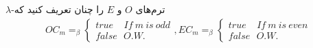 $\lambda$-ترم‌های $O$ و $E$ را چنان تعریف کنید که 
\begin{gather*}
    OC_m =_\beta \begin{cases}
        true \ \ \ \ \ If \ m \ is \ odd \\
        false \ \ \ O.W.
    \end{cases} 
    ,
    EC_m =_\beta \begin{cases}
        true \ \ \ \ \ If \ m \ is \ even \\
        false \ \ \ O.W.
    \end{cases}
\end{gather*}